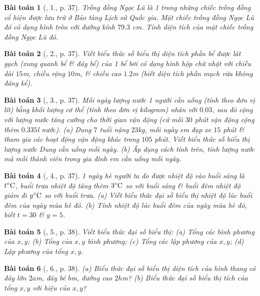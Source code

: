 \documentclass{article}
\newtheorem{baitoan}{Bài toán}
\begin{document}
\begin{baitoan}[\cite{SBT_Toan_7_Canh_Dieu_tap_2}, 1., p. 37]
	Trống đồng Ngọc Lũ là 1 trong những chiếc trống đồng cổ hiện được lưu trữ ở Bảo tàng Lịch sử Quốc gia. Mặt chiếc trống đồng Ngọc Lũ đó có dạng hình tròn với đường kính $79.3$ \emph{cm}. Tính diện tích của mặt chiếc trống đồng Ngọc Lũ đó.
\end{baitoan}

\begin{baitoan}[\cite{SBT_Toan_7_Canh_Dieu_tap_2}, 2., p. 37]
	Viết biểu thức số biểu thị diện tích phần bể được lát gạch (xung quanh bể \& đáy bể) của 1 bể bơi có dạng hình hộp chữ nhật với chiều dài $15$\emph{m}, chiều rộng $10$\emph{m}, \& chiều cao $1.2$\emph{m} (biết diện tích phần mạch vữa không đáng kể).
\end{baitoan}

\begin{baitoan}[\cite{SBT_Toan_7_Canh_Dieu_tap_2}, 3., p. 37]
	Mỗi ngày lượng nước 1 người cần uống (tính theo đơn vị lít) bằng khối lượng cơ thể (tính theo đơn vị kilogram) nhân với $0.03$, sau đó cộng với lượng nước tăng cường cho thời gian vận động (cứ mỗi $30$ phút vận động cộng thêm $0.335$\emph{l} nước). (a) Dung $7$ tuổi nặng $23$\emph{kg}, mỗi ngày em đạp xe $15$ phút \& tham gia các hoạt động vận động khác trong $105$ phút. Viết biểu thức số biểu thị lượng nước Dung cần uống mỗi ngày. (b) Áp dụng cách tính trên, tính lượng nước mà mỗi thành viên trong gia đình em cần uống mỗi ngày.
\end{baitoan}

\begin{baitoan}[\cite{SBT_Toan_7_Canh_Dieu_tap_2}, 4., p. 37]
	1 ngày hè người ta đo được nhiệt độ vào buổi sáng là $t^\circ{\rm C}$, buổi trưa nhiệt độ tăng thêm $3^\circ{\rm C}$ so với buổi sáng \& buổi đêm nhiệt độ giảm đi $y^\circ{\rm C}$ so với buổi trưa. (a) Viết biểu thức đại số biểu thị nhiệt độ lúc buổi đêm của ngày mùa hè đó. (b) Tính nhiệt độ lúc buổi đêm của ngày mùa hè đó, biết $t = 30$ \& $y = 5$.
\end{baitoan}

\begin{baitoan}[\cite{SBT_Toan_7_Canh_Dieu_tap_2}, 5., p. 38]
	Viết biểu thức đại số biểu thị: (a) Tổng các bình phương của $x,y$; (b) Tổng của $x,y$ bình phương; (c) Tổng các lập phương của $x,y$; (d) Lập phương của tổng $x,y$.
\end{baitoan}

\begin{baitoan}[\cite{SBT_Toan_7_Canh_Dieu_tap_2}, 6., p. 38]
	(a) Biểu thức đại số biểu thị diện tích của hình thang có đáy lớn $2a$\emph{m}, đáy bé $b$\emph{m}, đường cao $2h$\emph{m}? (b) Biểu thức đại số biểu thị tích của tổng $x,y$ với hiệu của $x,y$?
\end{baitoan}
\end{document}
